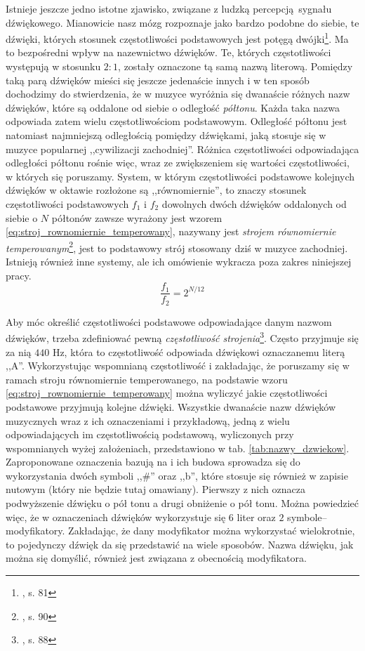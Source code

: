 Istnieje jeszcze jedno istotne zjawisko, związane z ludzką percepcją sygnału dźwiękowego. Mianowicie nasz mózg rozpoznaje jako bardzo podobne do siebie, te dźwięki, których stosunek częstotliwości podstawowych jest potęgą dwójki\footnote{\cite{lerch_introduction_2012}, s. 81}. Ma to bezpośredni wpływ na nazewnictwo dźwięków. Te, których częstotliwości występują w stosunku $2:1$, zostały oznaczone tą samą nazwą literową. Pomiędzy taką parą dźwięków mieści się jeszcze jedenaście innych i w ten sposób dochodzimy do stwierdzenia, że w muzyce wyróżnia się dwanaście różnych nazw dźwięków, które są oddalone od siebie o odległość \emph{półtonu}. Każda taka nazwa odpowiada zatem wielu częstotliwościom podstawowym. Odległość półtonu jest natomiast najmniejszą odległością pomiędzy dźwiękami, jaką stosuje się w muzyce popularnej ,,cywilizacji zachodniej''. Różnica częstotliwości odpowiadająca odległości półtonu rośnie więc, wraz ze zwiększeniem się wartości częstotliwości, w których się poruszamy. System, w którym częstotliwości podstawowe kolejnych dźwięków w oktawie rozłożone są ,,równomiernie'', to znaczy stosunek częstotliwości podstawowych $f_1$ i $f_2$ dowolnych dwóch dźwięków oddalonych od siebie o $N$ półtonów zawsze wyrażony jest wzorem \ref{eq:stroj_rownomiernie_temperowany}, nazywany jest \emph{strojem równomiernie temperowanym}\footnote{\cite{lerch_introduction_2012}, s. 90}, jest to podstawowy strój stosowany dziś w muzyce zachodniej. Istnieją również inne systemy, ale ich omówienie wykracza poza zakres niniejszej pracy.
\begin{equation} \label{eq:stroj_rownomiernie_temperowany}
    \frac{f_1}{f_2} = 2^{N/12}
\end{equation}

Aby móc określić częstotliwości podstawowe odpowiadające danym nazwom dźwięków, trzeba zdefiniować pewną \emph{częstotliwość strojenia}\footnote{\cite{lerch_introduction_2012}, s. 88}. Często przyjmuje się za nią $440$ Hz, która to częstotliwość odpowiada dźwiękowi oznaczanemu literą ,,A''. Wykorzystując wspomnianą częstotliwość i zakładając, że poruszamy się w ramach stroju równomiernie temperowanego, na podstawie wzoru \ref{eq:stroj_rownomiernie_temperowany} można wyliczyć jakie częstotliwości podstawowe przyjmują kolejne dźwięki. Wszystkie dwanaście nazw dźwięków muzycznych wraz z ich oznaczeniami i przykładową, jedną z wielu odpowiadających im częstotliwością podstawową, wyliczonych przy wspomnianych wyżej założeniach, przedstawiono w tab. \ref{tab:nazwy_dzwiekow}. Zaproponowane oznaczenia bazują na \cite{lerch_introduction_2012} i ich budowa sprowadza się do wykorzystania dwóch symboli ,,\#'' oraz ,,b'', które stosuje się również w zapisie nutowym (który nie będzie tutaj omawiany). Pierwszy z nich oznacza podwyższenie dźwięku o pół tonu a drugi obniżenie o pół tonu. Można powiedzieć więc, że w oznaczeniach dźwięków wykorzystuje się $6$ liter oraz $2$ symbole--modyfikatory. Zakładając, że dany modyfikator można wykorzystać wielokrotnie, to pojedynczy dźwięk da się przedstawić na wiele sposobów.  Nazwa dźwięku, jak można się domyślić, również jest związana z obecnością modyfikatora.

